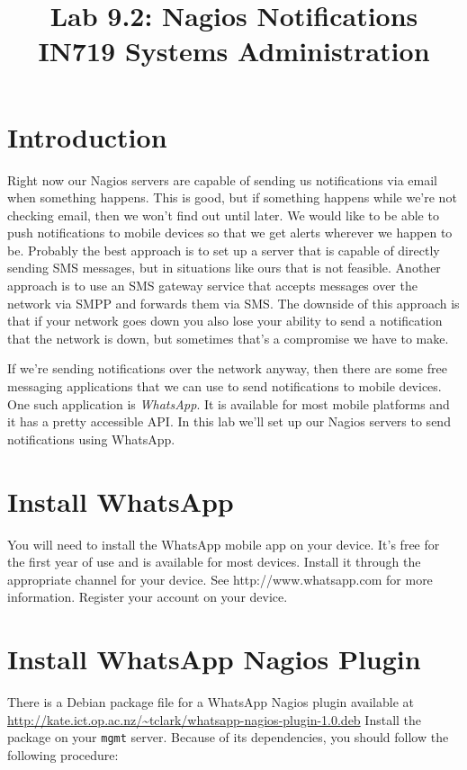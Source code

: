 \documentclass{article}   	%
\title{Lab 9.2:  Nagios Notifications\\ IN719 Systems Administration}
\date{}							%
\begin{document}
\maketitle

\section*{Introduction}
Right now our Nagios servers are capable of sending us notifications via email when something happens.  This is good, but if something happens while we're not checking email, then we won't find out until later.  We would like to be able to push notifications to mobile devices so that we get alerts wherever we happen to be.  Probably the best approach is to set up a server that is capable of directly sending SMS messages, but in situations like ours that is not feasible.  Another approach is to use an SMS gateway service that accepts messages over the network via SMPP and forwards them via SMS.  The downside of this approach is that if your network goes down you also lose your ability to send a notification that the network is down, but sometimes that's a compromise we have to make.

If we're sending notifications over the network anyway, then there are some free messaging applications that we can use to send notifications to mobile devices.  One such application is \emph{WhatsApp}.  It is available for most mobile platforms and it has a pretty accessible API.  In this lab we'll set up our Nagios servers to send notifications using WhatsApp.

\section{Install WhatsApp}
You will need to install the WhatsApp mobile app on your device.  It's free for the first year of use and is available for most devices.  Install it through the appropriate channel for your device. See http://www.whatsapp.com for more information.  Register your account on your device.

\section{Install WhatsApp Nagios Plugin}
There is a Debian package file for a WhatsApp Nagios plugin available at \url{http://kate.ict.op.ac.nz/~tclark/whatsapp-nagios-plugin-1.0.deb}  Install the package on your \texttt{mgmt} server.  Because of its dependencies, you should follow the following procedure:
\end{document}
